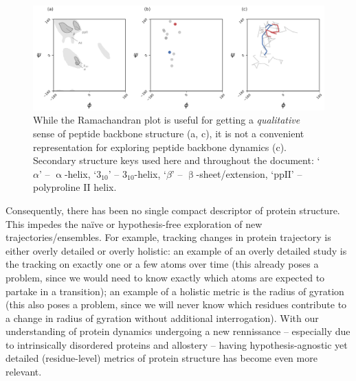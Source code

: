 \documentclass[fleqn,10pt,lineno]{wlpeerj} %
\newcommand{\Fig}[1]{Fig.~\ref{#1}}
\newcommand{\gname}{BackMAP}
\newcommand{\pname}{\textsc{\gname}\xspace}
\begin{document}
\begin{figure}[t!]
\begin{adjustwidth}{-1in}{0in} %
\centering
\includegraphics[width=1.0\linewidth]{automated_figures/fig_rama_intro.pdf}
\caption{While the Ramachandran plot is useful for getting a {\it qualitative} sense of peptide backbone structure (a, c), it is not a convenient representation for exploring peptide backbone dynamics (c). {\footnotesize Secondary structure keys used here and throughout the document: `$\alpha$' -- $\upalpha$-helix, `$3_{10}$' -- $3_{10}$-helix, `$\beta$' -- $\upbeta$-sheet/extension, `$\textrm{ppII}$' -- polyproline II helix.}\label{fig:ramaintro}} 
\end{adjustwidth}
\end{figure}

Consequently, there has been no single compact descriptor of protein structure. This impedes the na{\"i}ve or hypothesis-free exploration of new trajectories/ensembles. %
For example, tracking changes in protein trajectory is either overly detailed or overly holistic: an example of an overly detailed study is the tracking on exactly one or a few atoms over time (this already poses a problem, since we would need to know exactly which atoms are expected to partake in a transition); an example of a holistic metric is the radius of gyration (this also poses a problem, since we will never know which residues contribute to a change in radius of gyration without additional interrogation). %
With our understanding of protein dynamics undergoing a new rennissance -- especially due to intrinsically disordered proteins and allostery -- having hypothesis-agnostic yet detailed (residue-level) metrics of protein structure has become even more relevant. 
\end{document}
